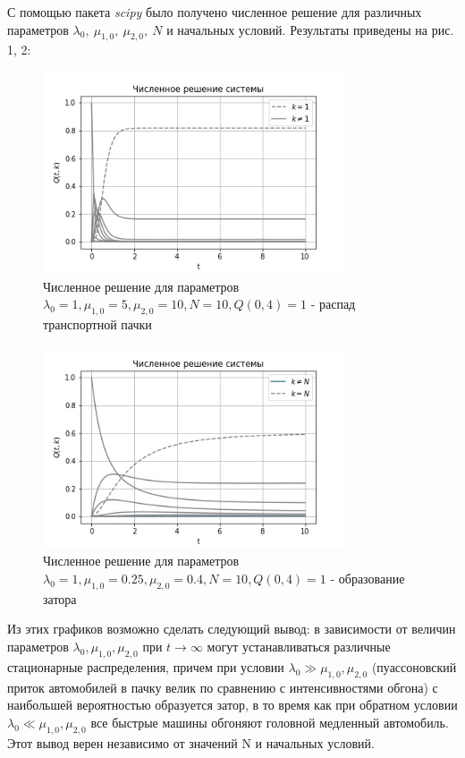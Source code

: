 \documentclass[a4paper, 14pt, russian]{article}
\begin{document}
С помощью пакета \textit{scipy} было получено численное решение для различных параметров $\lambda_0, \ \mu_{1,0}, \ \mu_{2,0}, \ N$ и начальных условий. Результаты приведены на рис. 1, 2:

\begin{figure}[!ht]
\includegraphics[width=0.8\textwidth]{pictures/1.jpg}
\caption{Численное решение для параметров $\lambda_0 = 1, \mu_{1,0} = 5, \mu_{2,0} = 10, N = 10, Q(0, 4) = 1$ - распад транспортной пачки}
\centering
\end{figure}

\begin{figure}[!ht]
\includegraphics[width=0.8\textwidth]{pictures/2.jpg}
\caption{Численное решение для параметров $\lambda_0 = 1, \mu_{1,0} = 0.25, \mu_{2,0} = 0.4, N = 10, Q(0, 4) = 1$ - образование затора}
\centering
\end{figure}

Из этих графиков возможно сделать следующий вывод: в зависимости от величин параметров $\lambda_0, \mu_{1,0}, \mu_{2,0}$ при $t \rightarrow \infty$ могут устанавливаться различные стационарные распределения, причем при условии $\lambda_0 \gg \mu_{1,0}, \mu_{2,0}$ (пуассоновский приток автомобилей в пачку велик по сравнению с интенсивностями обгона) с наибольшей вероятностью образуется затор, в то время как при обратном условии $\lambda_0 \ll \mu_{1,0}, \mu_{2,0}$ все быстрые машины обгоняют головной медленный автомобиль. Этот вывод верен независимо от значений N и начальных условий.
\end{document}
